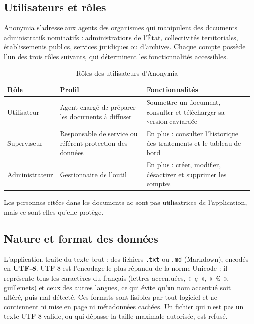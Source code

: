 \documentclass[12pt,a4paper]{article}
\begin{document}
\subsection{Utilisateurs et rôles}

Anonymia s'adresse aux agents des organismes qui manipulent des documents administratifs nominatifs : administrations de l'État, collectivités territoriales, établissements publics, services juridiques ou d'archives. Chaque compte possède l'un des trois rôles suivants, qui déterminent les fonctionnalités accessibles.

\begin{table}[htbp]
    \centering
    \renewcommand{\arraystretch}{1.3}
    \begin{tabular}{p{2.5cm} p{5.6cm} p{6.4cm}}
        \toprule
        \textbf{Rôle} & \textbf{Profil} & \textbf{Fonctionnalités} \\
        \midrule
        Utilisateur & Agent chargé de préparer les documents à diffuser & Soumettre un document, consulter et télécharger sa version caviardée \\
        Superviseur & Responsable de service ou référent protection des données & En plus : consulter l'historique des traitements et le tableau de bord \\
        Administrateur & Gestionnaire de l'outil & En plus : créer, modifier, désactiver et supprimer les comptes \\
        \bottomrule
    \end{tabular}
    \caption{Rôles des utilisateurs d'Anonymia}
    \label{tab:roles}
\end{table}

Les personnes citées dans les documents ne sont pas utilisatrices de l'application, mais ce sont elles qu'elle protège.

\subsection{Nature et format des données}

L'application traite du texte brut : des fichiers \texttt{.txt} ou \texttt{.md} (Markdown), encodés en \textbf{UTF-8}. UTF-8 est l'encodage le plus répandu de la norme Unicode : il représente tous les caractères du français (lettres accentuées, «~ç~», «~€~», guillemets) et ceux des autres langues, ce qui évite qu'un nom accentué soit altéré, puis mal détecté. Ces formats sont lisibles par tout logiciel et ne contiennent ni mise en page ni métadonnées cachées. Un fichier qui n'est pas un texte UTF-8 valide, ou qui dépasse la taille maximale autorisée, est refusé.
\end{document}
